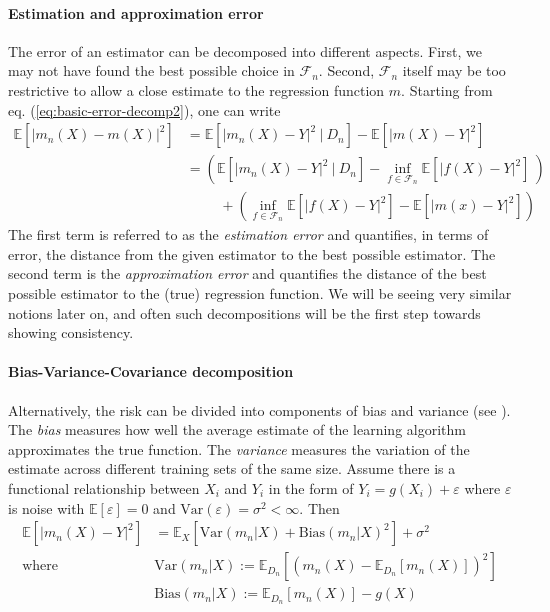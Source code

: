 \documentclass[10pt]{article}
\theoremstyle{definition}
\begin{document}
\paragraph{Estimation and approximation error}
The error of an estimator can be decomposed into different aspects. First, we
may not have found the best possible choice in \(\mathcal{F}_{n}\). Second,
\(\mathcal{F}_{n}\) itself may be too restrictive to allow a close estimate to
the regression function \(m\).
Starting from eq. (\ref{eq:basic-error-decomp2}), one can write
%
\begin{align*}
\mathbb{E}\left[|m_{n}(X) - m(X)|^2\right] &= 
\mathbb{E}\left[|m_{n}(X) - Y|^2 ~|~ D_{n}  \right] 
-
\mathbb{E}\left[|m(X)-Y|^2\right] \\
&=  
\left(
\mathbb{E}\left[|m_{n}(X) - Y|^2 ~|~ D_{n}  \right]
- 
\inf_{f \in \mathcal{F}_{n}} \mathbb{E}\left[| f(X) -Y |^2\right]  \
\right)
 \\ 
& \hspace{1cm}+ \left(
\inf_{f \in \mathcal{F}_{n}} \mathbb{E}\left[| f(X) -Y |^2\right]  -
\mathbb{E}\left[|m(x)-Y|^2\right]\right)
\end{align*}
%
The first term is referred to as the \emph{estimation error} and
quantifies, in terms of error, the distance from the given estimator to
the best possible estimator. The second term is the \emph{approximation
error} and quantifies the distance of the best possible estimator to the
(true) regression function. We will be seeing very similar notions later on, and
often such decompositions will be the first step towards showing consistency.

\paragraph{Bias-Variance-Covariance decomposition}
Alternatively, the risk can be divided into components of bias and
variance (see \cite{ueda_GeneralizationErrorEnsemble_1996}). The \textit{bias} measures how well the average estimate of the
learning algorithm approximates the true function. The \textit{variance}
measures the variation of the estimate across different training sets of the
same size.
%
Assume there is a functional relationship between $X_i$ and $Y_i$ in the form of
$Y_i = g(X_i) + \varepsilon$ where $\varepsilon$ is noise with
$\mathbb{E}[\varepsilon]=0$ and $\text{Var}(\varepsilon) = \sigma^2 <
\infty$.
Then
\begin{align*}
  \mathbb{E}\left[ |m_{n}(X) - Y |^2 \right]  &=\mathbb{E}_{X}\left[
  \text{Var}(m_{n}|X) + \text{Bias}(m_{n}|X)^2 
                                                \right] + \sigma^2 \\
  \text{where} \hspace{1cm} &
                              \text{Var}(m_{n}|X) :=  \mathbb{E}_{D_{n}}\left[  (m_{n}(X) -  \mathbb{E}_{D_{n}}\left[ m_{n}(X) \right])^2  \right] \\
  & \text{Bias}(m_{n}|X) :=  \mathbb{E}_{D_{n}} \left[ m_{n}(X) \right] - g(X)
\end{align*}
\end{document}
